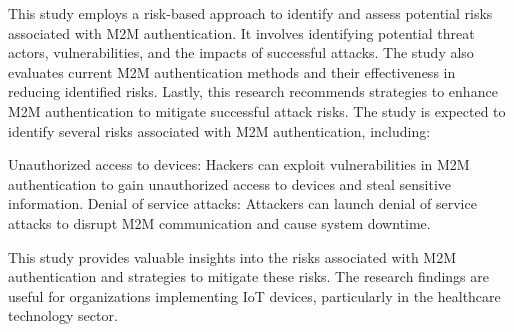 This study employs a risk-based approach to identify and assess potential risks associated with M2M authentication. It involves identifying potential threat actors, vulnerabilities, and the impacts of successful attacks. The study also evaluates current M2M authentication methods and their effectiveness in reducing identified risks. Lastly, this research recommends strategies to enhance M2M authentication to mitigate successful attack risks. The study is expected to identify several risks associated with M2M authentication, including:

Unauthorized access to devices: Hackers can exploit vulnerabilities in M2M authentication to gain unauthorized access to devices and steal sensitive information.
Denial of service attacks: Attackers can launch denial of service attacks to disrupt M2M communication and cause system downtime.

This study provides valuable insights into the risks associated with M2M authentication and strategies to mitigate these risks. The research findings are useful for organizations implementing IoT devices, particularly in the healthcare technology sector.